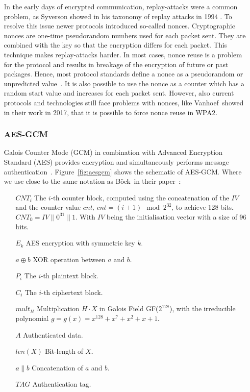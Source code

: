 In the early days of encrypted communication, replay-attacks were a common
problem, as Syverson showed in his taxonomy of replay attacks in 1994
\cite{replaytax}. To resolve this issue newer protocols introduced so-called
nonces. Cryptographic nonces are one-time pseudorandom numbers used for each
packet sent. They are combined with the key so that the encryption differs for
each packet. This technique makes replay-attacks harder. In most cases, nonce
reuse is a problem for the protocol and results in breakage of the encryption of
future or past packages. Hence, most protocol standards define a nonce as a
pseudorandom or unpredicted value~\cite{noncegeneral}. It is also possible to
use the nonce as a counter which has a random start value and increases for each
packet sent. However, also current protocols and technologies still face
problems with nonces, like Vanhoef~\etal showed in their work in 2017, that it
is possible to force nonce reuse in WPA2\cite{wpanoncereuse}.

\subsubsection{AES-GCM}

Galois Counter Mode (GCM) in combination with Advanced Encryption Standard (AES)
provides encryption and simultaneously performs message
authentication~\cite{gcm, gcmnist}. Figure~\ref{fig:aesgcm} shows the schematic
of AES-GCM. Where we use close to the same notation as Böck~\etal in their
paper~\cite{gcmnonceattack}:

\begin{itemize}
  \item[$CNT_i$] The $i$-th counter block, computed using the concatenation of
the $IV$ and the counter value $cnt$, $cnt = (i+1) \mod{2^{32}}$, to achieve 128
bits. $CNT_0 = IV \parallel 0 ^{31} \parallel 1$. With $IV$ being the
initialisation vector with a size of 96 bits.
  \item[$E_k$] AES encryption with symmetric key $k$.
  \item[$a \oplus b$] XOR operation between $a$ and $b$.
  \item[$P_i$] The $i$-th plaintext block.
  \item[$C_i$] The $i$-th ciphertext block.
  \item[$mult_H$] Multiplication $H \cdot X$ in Galois Field GF($2^{128}$),
with the irreducible polynomial $g = g(x) = x^{128} + x^{7} + x^{2} + x + 1$.
  \item[$A$] Authenticated data.
  \item[$len(X)$] Bit-length of $X$.
  \item[$a \parallel b$] Concatenation of $a$ and $b$.
  \item[$TAG$] Authentication tag.
\end{itemize}

